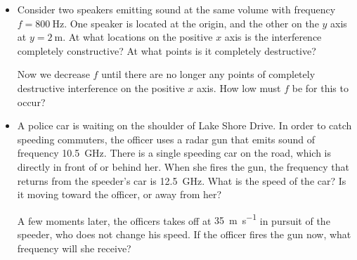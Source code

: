\documentclass[11pt]{article}
\begin{document}
\newcommand{\dist}{\SI{2}{\meter}}
\newcommand{\freq}{\SI{800}{\Hz}}
\newcommand{\vsound}{\SI{344}{\meter\per\second}}
	
\begin{itemize}
\item Consider two speakers emitting sound at the same volume with frequency $f = \freq$.  One speaker is located at the origin, and the other on the $y$ axis at $y = \dist$.  At what locations on the positive $x$ axis is the interference completely constructive?  At what points is it completely destructive?
	
Now we decrease $f$ until there are no longer any points of completely destructive interference on the positive $x$ axis.  How low must $f$ be for this to occur?


\bigskip\bigskip\bigskip

\newcommand{\ofreq}{\SI{10.5}{\giga\Hz}}
\newcommand{\ifreq}{\SI{12.5}{\giga\Hz}}
\newcommand{\pspeed}{\SI{35}{\meter\per\second}}


\item A police car is waiting on the shoulder of Lake Shore Drive.  In order to catch speeding commuters, the officer uses a radar gun that emits sound of frequency {\ofreq}.  There is a single speeding car on the road, which is directly in front of or behind her.  When she fires the gun, the frequency that returns from the speeder's car is {\ifreq}.  What is the speed of the car?  Is it moving toward the officer, or away from her?

A few moments later, the officers takes off at {\pspeed} in pursuit of the speeder, who does not change his speed.  If the officer fires the gun now, what frequency will she receive?

\end{itemize}
\end{document}
